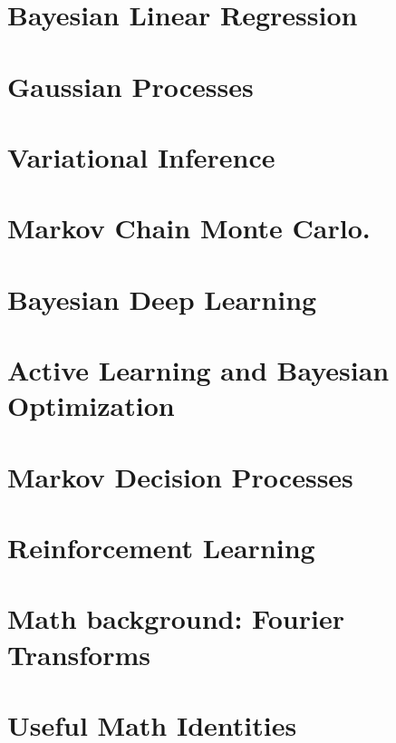 \documentclass[11pt]{article}
\begin{document}
\newpage

\section{Bayesian Linear Regression}
\newpage

\section{Gaussian Processes}
\newpage


\section{Variational Inference}
\newpage

\section{Markov Chain Monte Carlo.}
\newpage

\section{Bayesian Deep Learning}
\newpage

\section{Active Learning and Bayesian Optimization}
\newpage

\section{Markov Decision Processes}
\newpage

\section{Reinforcement Learning}
\newpage

\appendix
\section{Math background: Fourier Transforms}
\newpage
\section{Useful Math Identities}
\end{document}
